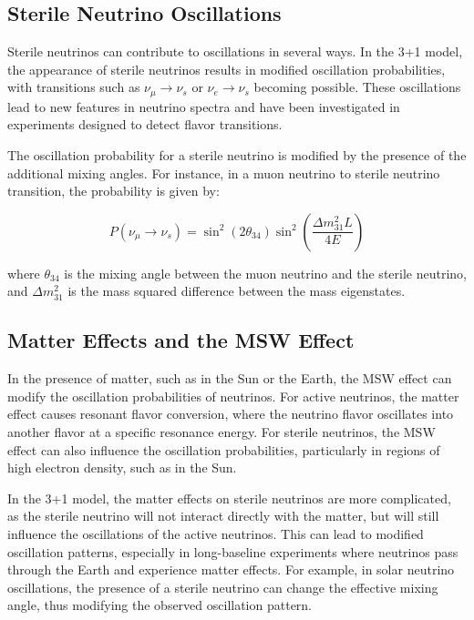 \documentclass[a4paper,12pt,numbered]{article}
\begin{document}
\subsection{Sterile Neutrino Oscillations}

Sterile neutrinos can contribute to oscillations in several ways. In the 3+1 model, the appearance of sterile neutrinos results in modified oscillation probabilities, with transitions such as \( \nu_\mu \to \nu_s \) or \( \nu_e \to \nu_s \) becoming possible. These oscillations lead to new features in neutrino spectra and have been investigated in experiments designed to detect flavor transitions.

The oscillation probability for a sterile neutrino is modified by the presence of the additional mixing angles. For instance, in a muon neutrino to sterile neutrino transition, the probability is given by:

\[
P(\nu_\mu \to \nu_s) = \sin^2(2\theta_{34}) \sin^2 \left( \frac{\Delta m^2_{31} L}{4E} \right)
\]

where \( \theta_{34} \) is the mixing angle between the muon neutrino and the sterile neutrino, and \( \Delta m^2_{31} \) is the mass squared difference between the mass eigenstates.

\subsection{Matter Effects and the MSW Effect}

In the presence of matter, such as in the Sun or the Earth, the MSW effect can modify the oscillation probabilities of neutrinos. For active neutrinos, the matter effect causes resonant flavor conversion, where the neutrino flavor oscillates into another flavor at a specific resonance energy. For sterile neutrinos, the MSW effect can also influence the oscillation probabilities, particularly in regions of high electron density, such as in the Sun. 

In the 3+1 model, the matter effects on sterile neutrinos are more complicated, as the sterile neutrino will not interact directly with the matter, but will still influence the oscillations of the active neutrinos. This can lead to modified oscillation patterns, especially in long-baseline experiments where neutrinos pass through the Earth and experience matter effects. For example, in solar neutrino oscillations, the presence of a sterile neutrino can change the effective mixing angle, thus modifying the observed oscillation pattern.
\end{document}
